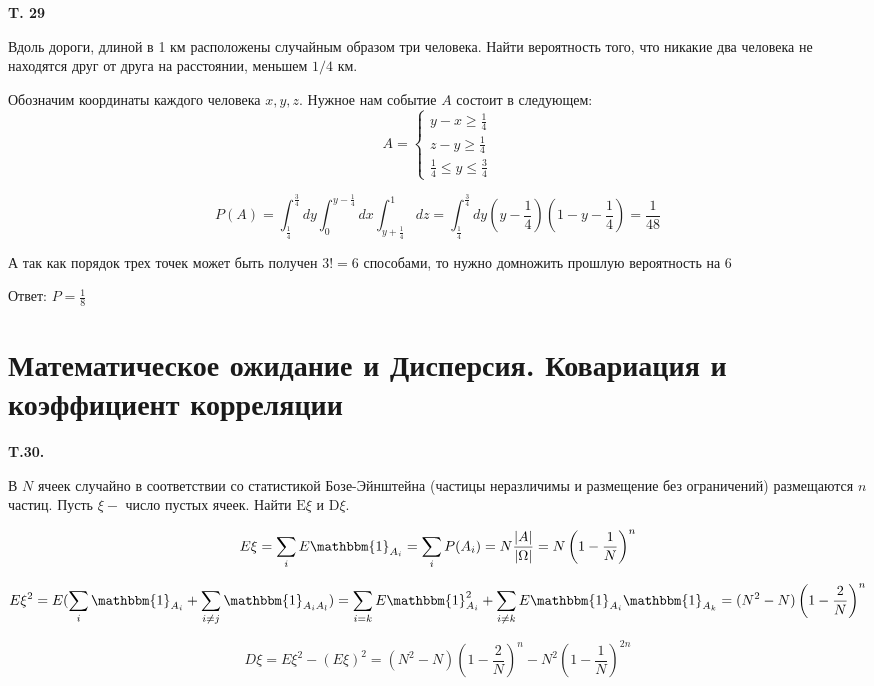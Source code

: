 \documentclass[a4paper,12pt]{article} %
\begin{document}
\begin{example} \textbf{T. 29 }

Вдоль дороги, длиной в 1 км расположены случайным образом три человека. 
Найти вероятность того, что никакие два человека не находятся друг от друга на расстоянии, меньшем $1 / 4$ км.

Обозначим координаты каждого человека $ x,y,z$. Нужное нам событие $A$ состоит в следующем:
\[  A=
\begin{cases} 
y-x \ge \frac{1}{4} \\ 
z-y \ge \frac{1}{4} \\ 
\frac{1}{4}\le y \le \frac{3}{4}
\end{cases}  \]

\[ P(A)=\int_{\frac{1}{4}}^{\frac{3}{4}} dy \int_{0}^{y-\frac{1}{4}} dx \int_{y+\frac{1}{4}}^{1}dz= 
\int_{\frac{1}{4}}^{\frac{3}{4}} dy \left(y-\frac{1}{4}\right)\left(1-y-\frac{1}{4}\right)=\frac{1}{48}\]

А так как порядок трех точек может быть получен $ 3!=6$ способами, то нужно домножить прошлую вероятность на 6

Ответ: $ P=\frac{1}{8} $

\end{example}







\section{Математическое ожидание и Дисперсия. Ковариация и коэффициент корреляции}


\begin{example} \textbf{T.30.} 

В $N$ ячеек случайно в соответствии со статистикой Бозе-Эйнштейна (частицы неразличимы и размещение без ограничений) размещаются $n$ частиц. Пусть $\xi-$ число пустых ячеек. Найти $\mathrm{E} \xi$ и $\mathrm{D} \xi$.

\[ E \xi = \sum_i E \mathbbm{1}_{A_i}=
\sum_i P(A_i) = N \frac{|A|}{|\Omega|}=
N  \left(1-\frac{1}{N}\right)^n\]




\[ E\xi^2 = 
E(\sum_{i}\mathbbm{1}_{A_i} +\sum_{i\ne j}\mathbbm{1}_{A_i A_l})=
\sum_{i=k}E \mathbbm{1}_{A_i}^2+\sum_{i\ne k}E \mathbbm{1}_{A_i} \mathbbm{1}_{A_k}=
(N^2-N)\left(1- \frac{2}{N}\right)^n
\]



\[ D\xi = E\xi^2 - (E\xi)^2 =
(N^2-N)\left(1- \frac{2}{N}\right)^n-N^2\left(1-\frac{1}{N}\right)^{2n} \]


\end{example}
\end{document}
